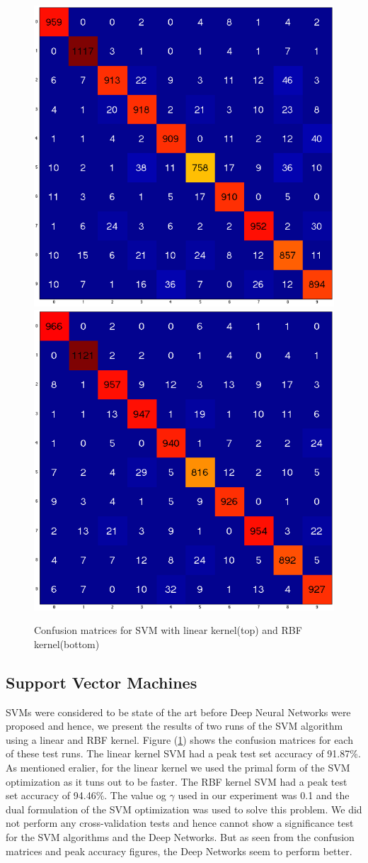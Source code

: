 \documentclass[10pt,twocolumn,letterpaper]{article}
\begin{document}
\begin{figure}[t]
\begin{center}
   	\includegraphics[width=0.65\linewidth]{../images/confusion_svm.png}
	\includegraphics[width=0.65\linewidth]{../images/confusion_svm_rbf.png}
\end{center}
   \caption{Confusion matrices for SVM with linear kernel(top) and RBF kernel(bottom)}
   \label{fig:confusionsvm}
\end{figure}

\subsection{Support Vector Machines}
SVMs were considered to be state of the art before Deep Neural Networks were proposed and hence, we present the results of two runs of the SVM algorithm using a linear and RBF kernel. Figure (\ref{fig:confusionsvm}) shows the confusion matrices for each of these test runs. The linear kernel SVM had a peak test set accuracy of 91.87\%. As mentioned eralier, for the linear kernel we used the primal form of the SVM optimization as it tuns out to be faster. The RBF kernel SVM had a peak test set accuracy of 94.46\%. The value og $\gamma$ used in our experiment was 0.1 and the dual formulation of the SVM optimization was used to solve this problem. We did not perform any cross-validation tests and hence cannot show a significance test for the SVM algorithms and the Deep Networks. But as seen from the confusion matrices and peak accuracy figures, the Deep Networks seem to perform better.\\
\end{document}
